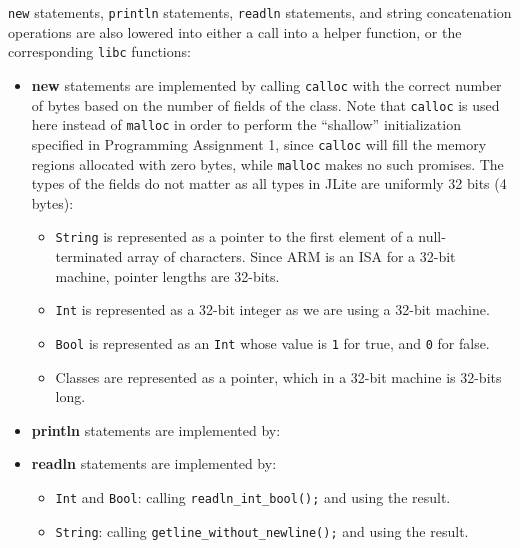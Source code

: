 \documentclass[nonacm, acmsmall, screen, 10pt]{acmart}
\begin{document}
\texttt{new} statements, \texttt{println} statements, \texttt{readln} statements, and string concatenation operations are also lowered into either a call into a helper function, or the corresponding \texttt{libc} functions:
\begin{itemize}
  \item \textbf{new} statements are implemented by calling \texttt{calloc} with the correct number of bytes based on the number of fields of the class.
        Note that \texttt{calloc} is used here instead of \texttt{malloc} in order to perform the ``shallow'' initialization specified in Programming Assignment 1, since \texttt{calloc} will fill the memory regions allocated with zero bytes, while \texttt{malloc} makes no such promises.
        The types of the fields do not matter as all types in JLite are uniformly 32 bits (4 bytes):
        \begin{itemize}
          \item \texttt{String} is represented as a pointer to the first element of a null-terminated array of characters. Since ARM is an ISA for a 32-bit machine, pointer lengths are 32-bits.
          \item \texttt{Int} is represented as a 32-bit integer as we are using a 32-bit machine.
          \item \texttt{Bool} is represented as an \texttt{Int} whose value is \texttt{1} for true, and \texttt{0} for false.
          \item Classes are represented as a pointer, which in a 32-bit machine is 32-bits long.
        \end{itemize}
  \item \textbf{println} statements are implemented by:
  \item \textbf{readln} statements are implemented by:
        \begin{itemize}
          \item \texttt{Int} and \texttt{Bool}: calling \texttt{readln_int_bool();} and using the result.
          \item \texttt{String}: calling \texttt{getline_without_newline();} and using the result.

\end{itemize}
\end{itemize}
\end{document}
